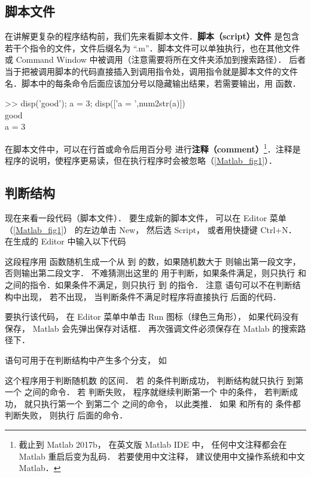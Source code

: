 

\subsection{脚本文件}
在讲解更复杂的程序结构前，我们先来看脚本文件．\textbf{脚本（script）文件} 是包含若干个指令的文件，文件后缀名为 “.m”．脚本文件可以单独执行，也在其他文件或 Command Window 中被调用（注意需要将所在文件夹添加到搜索路径）． 后者当于把被调用脚本的代码直接插入到调用指令处，调用指令就是脚本文件的文件名．脚本中的每条命令后面应该加分号以隐藏输出结果，若需要输出，用  函数．
\begin{Command}
>> disp({\color{string}'good'}); a = 3; disp([{\color{string}'a = '},num2str(a)]) \\
good \\
a = 3
\end{Command}
在脚本文件中，可以在行首或命令后用百分号 \x{\%} 进行\textbf{注释（comment）}\footnote{截止到 Matlab 2017b， 在英文版 Matlab IDE 中， 任何中文注释都会在 Matlab 重启后变为乱码． 若要使用中文注释， 建议使用中文操作系统和中文 Matlab．}．注释是程序的说明，使程序更易读，但在执行程序时会被忽略（\autoref{Matlab_fig1}）．

\subsection{判断结构}
现在来看一段代码（脚本文件）． 要生成新的脚本文件， 可以在 Editor 菜单（\autoref{Matlab_fig1}） 的左边单击 New， 然后选 Script， 或者用快捷键 Ctrl+N． 在生成的 Editor 中输入以下代码

这段程序用  函数随机生成一个从  到  的数，如果随机数大于  则输出第一段文字，否则输出第二段文字． 不难猜测出这里的  用于判断，如果条件满足，则只执行  和  之间的指令．如果条件不满足，则只执行  到  的指令． 注意  语句可以不在判断结构中出现， 若不出现， 当判断条件不满足时程序将直接执行  后面的代码．

要执行该代码， 在 Editor 菜单中单击 Run 图标（绿色三角形）， 如果代码没有保存， Matlab 会先弹出保存对话框． 再次强调文件必须保存在 Matlab 的搜索路径下．

 语句可用于在判断结构中产生多个分支， 如

这个程序用于判断随机数  的区间． 若  的条件判断成功， 判断结构就只执行  到第一个  之间的命令． 若  判断失败， 程序就继续判断第一个  中的条件， 若判断成功， 就只执行第一个  到第二个  之间的命令， 以此类推． 如果  和所有的  条件都判断失败， 则执行  后面的命令．

